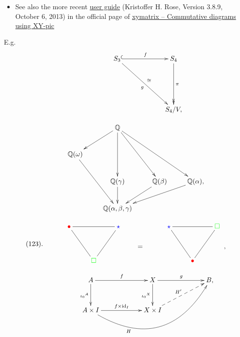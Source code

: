 \documentclass[a4paper,12pt]{article}
\newtheorem{Fundamental Theorem}{Fundamental Theorem}
\def \id {\mathrm{id}}
\newcommand{\Q}{\mathbb{Q}}
\renewcommand{\a}{{\alpha}}
\renewcommand{\b}{{\beta}}
\def \g {\gamma}
\def \w {\omega}
\def \red{\textcolor{red}}
\def \green{\textcolor{green}}
\def \blue{\textcolor{blue}}
\begin{document}
\begin{itemize}
\begin{itemize}
\item See also the more recent \href{https://anorien.csc.warwick.ac.uk/mirrors/CTAN/macros/generic/diagrams/xypic/doc/xyguide.pdf}{user guide} (Kristoffer H. Rose,
Version 3.8.9, October 6, 2013) in the official page of \href{https://ctan.org/pkg/xymatrix?lang=en}{xymatrix – Commutative diagrams using XY-pic
}
\end{itemize}


E.g.$$\xymatrix@R=60pt@C=60pt{&S_3 \ar@{^{(}->}[r]^f \ar[dr]_{g}^{\cong} &S_4 \ar@{->>}[d]^\pi \\
&&S_4/V,
}
$$

\[
\xymatrix{ && \Q\\ 
& \Q(\w) \ar@{<-}[ur] \\ & & \Q(\g)\ar@{<-}[uu] & \Q(\b)\ar@{<-}[uul] & \Q(\a),\ar@{<-}[uull]\\
&&\Q(\a,\b,\g)\ar@{<-}[uul]\ar@{<-}[u] \ar@{<-}[ur] \ar@{<-}[urr]
} 
\] 

$$\xymatrix@R=1pt{\\\\\\(123).}\xymatrix@R=39pt{ & \red{\bullet}\ar@{-}[dr]  \ar@{-}[rr] && \blue{\star}\ar@{-}[dl] \\
                && \green{\square} }\qquad\xymatrix@R=1pt{\\\\\\\\ =}
\xymatrix@R=39pt{ & \blue{\star}\ar@{-}[dr]  \ar@{-}[rr] && \green{\square}\ar@{-}[dl] \\
                && \red{\bullet} }  \xymatrix@R=1pt{\\\\\\\\ ,}$$

$$\xymatrix@R=30pt@C=60pt
{&A\ar[d]_{{\iota_0}^A}  \ar[r]^f & X\ar[d]_{{\iota_0}^X} \ar[r]^g & B,\\
            & A \times I  \ar@/_4pc/[rru]_<<<<<<<<<<<{H} \ar[r]^{f \times \id_I} & X\times I \ar@{-->}[ur]^{H'} } $$



\end{itemize}
\end{document}
